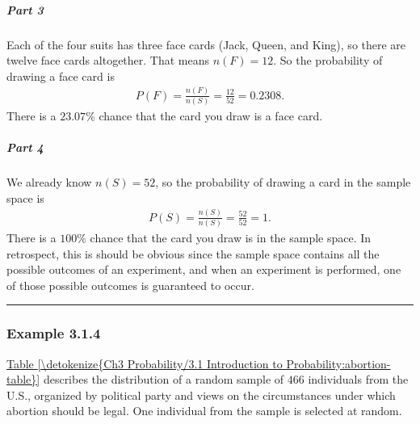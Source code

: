 \documentclass[letterpaper,10pt,english]{jupyterBook}
\begin{document}
\subparagraph{Part 3}
\label{\detokenize{Ch3 Probability/3.1 Introduction to Probability:id9}}
\sphinxAtStartPar
Each of the four suits has three face cards (Jack, Queen, and King), so there are twelve face cards altogether. That means \(n(F) = 12\). So the probability of drawing a face card is
\begin{equation*}
\begin{split} P(F) = \frac{n(F)}{n(S)} = \frac{12}{52} = 0.2308. \end{split}
\end{equation*}
\sphinxAtStartPar
There is a \(23.07\%\) chance that the card you draw is a face card.


\subparagraph{Part 4}
\label{\detokenize{Ch3 Probability/3.1 Introduction to Probability:part-4}}
\sphinxAtStartPar
We already know \(n(S) = 52\), so the probability of drawing a card in the sample space is
\begin{equation*}
\begin{split} P(S) = \frac{n(S)}{n(S)} = \frac{52}{52} = 1. \end{split}
\end{equation*}
\sphinxAtStartPar
There is a \(100\%\) chance that the card you draw is in the sample space. In retrospect, this is should be obvious since the sample space contains all the possible outcomes of an experiment, and when an experiment is performed, one of those possible outcomes is guaranteed to occur.


\bigskip\hrule\bigskip



\subsubsection{Example 3.1.4}
\label{\detokenize{Ch3 Probability/3.1 Introduction to Probability:example-3-1-4}}
\sphinxAtStartPar
\hyperref[\detokenize{Ch3 Probability/3.1 Introduction to Probability:abortion-table}]{Table \ref{\detokenize{Ch3 Probability/3.1 Introduction to Probability:abortion-table}}} describes the distribution of a random sample of \(466\) individuals from the U.S., organized by political party and views on the circumstances under which abortion should be legal. One individual from the sample is selected at random.
\end{document}
